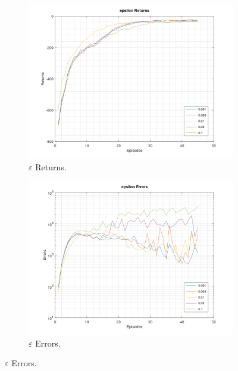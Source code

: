 \documentclass[a4paper,11pt]{article}
\begin{document}
\begin{figure}[h!]
	\begin{subfigure}[b]{0.4\linewidth}
		\includegraphics[width=\linewidth]{epsilon-returns.png}
		\caption{$\varepsilon$ Returns.}
	\end{subfigure}
	\begin{subfigure}[b]{0.4\linewidth}
		\includegraphics[width=\linewidth]{epsilon-errors.png}
		\caption{$\varepsilon$ Errors.}
	\end{subfigure}


\end{figure}
\end{document}
